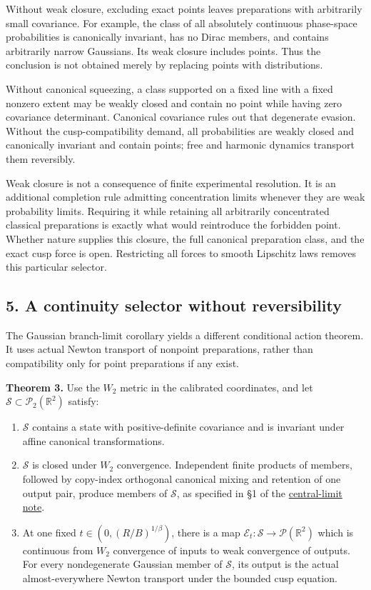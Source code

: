 \documentclass[11pt,a4paper]{article}
\newcommand{\tightlist}{\setlength{\itemsep}{0pt}\setlength{\parskip}{0pt}}
\begin{document}
Without weak closure, excluding exact points leaves preparations with
arbitrarily small covariance. For example, the class of all absolutely
continuous phase-space probabilities is canonically invariant, has no
Dirac members, and contains arbitrarily narrow Gaussians. Its weak
closure includes points. Thus the conclusion is not obtained merely by
replacing points with distributions.

Without canonical squeezing, a class supported on a fixed line with a
fixed nonzero extent may be weakly closed and contain no point while
having zero covariance determinant. Canonical covariance rules out that
degenerate evasion. Without the cusp-compatibility demand, all
probabilities are weakly closed and canonically invariant and contain
points; free and harmonic dynamics transport them reversibly.

Weak closure is not a consequence of finite experimental resolution. It
is an additional completion rule admitting concentration limits whenever
they are weak probability limits. Requiring it while retaining all
arbitrarily concentrated classical preparations is exactly what would
reintroduce the forbidden point. Whether nature supplies this closure,
the full canonical preparation class, and the exact cusp force is open.
Restricting all forces to smooth Lipschitz laws removes this particular
selector.

\hypertarget{a-continuity-selector-without-reversibility}{%
\subsection{5. A continuity selector without
reversibility}\label{a-continuity-selector-without-reversibility}}

The Gaussian branch-limit corollary yields a different conditional
action theorem. It uses actual Newton transport of nonpoint
preparations, rather than compatibility only for point preparations if
any exist.

\textbf{Theorem 3.} Use the \(W_2\) metric in the calibrated
coordinates, and let \(\mathcal S\subset\mathcal P_2(\mathbb R^2)\)
satisfy:

\begin{enumerate}
\def\labelenumi{\arabic{enumi}.}
\tightlist
\item
  \(\mathcal S\) contains a state with positive-definite covariance and
  is invariant under affine canonical transformations.
\item
  \(\mathcal S\) is closed under \(W_2\) convergence. Independent finite
  products of members, followed by copy-index orthogonal canonical
  mixing and retention of one output pair, produce members of
  \(\mathcal S\), as specified in §1 of the
  \href{central-limit-canonical-gaussian-sector.md}{central-limit note}.
\item
  At one fixed \(t\in(0,(R/B)^{1/\beta})\), there is a map
  \(\mathcal E_t:\mathcal S\to\mathcal P(\mathbb R^2)\) which is
  continuous from \(W_2\) convergence of inputs to weak convergence of
  outputs. For every nondegenerate Gaussian member of \(\mathcal S\),
  its output is the actual almost-everywhere Newton transport under the
  bounded cusp equation.
\end{enumerate}
\end{document}
